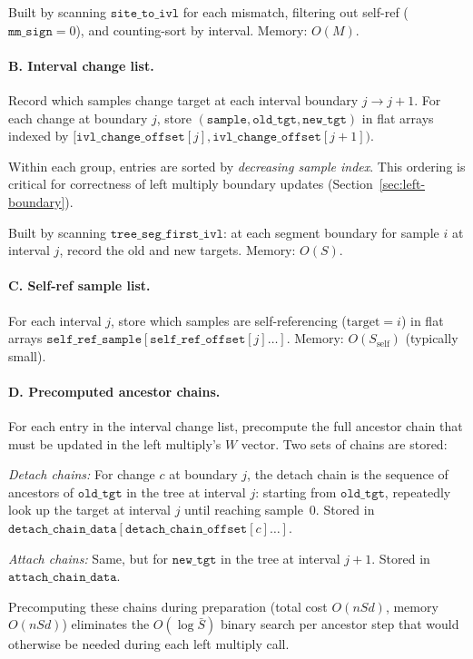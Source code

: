 \documentclass[11pt]{article}
\begin{document}
Built by scanning $\texttt{site\_to\_ivl}$ for each mismatch, filtering
out self-ref ($\texttt{mm\_sign} = 0$), and counting-sort by interval.
Memory: $O(M)$.

\paragraph{B. Interval change list.}
Record which samples change target at each interval boundary $j \to j{+}1$.
For each change at boundary $j$, store
$(\texttt{sample}, \texttt{old\_tgt}, \texttt{new\_tgt})$ in flat arrays
indexed by $[\texttt{ivl\_change\_offset}[j],
\texttt{ivl\_change\_offset}[j{+}1])$.

Within each group, entries are sorted by \emph{decreasing sample index}.
This ordering is critical for correctness of left multiply boundary updates
(Section~\ref{sec:left-boundary}).

Built by scanning $\texttt{tree\_seg\_first\_ivl}$: at each segment
boundary for sample $i$ at interval $j$, record the old and new targets.
Memory: $O(S)$.

\paragraph{C. Self-ref sample list.}
For each interval $j$, store which samples are self-referencing
($\text{target} = i$) in flat arrays
$\texttt{self\_ref\_sample}[\texttt{self\_ref\_offset}[j] \ldots]$.
Memory: $O(S_\text{self})$ (typically small).

\paragraph{D. Precomputed ancestor chains.}
For each entry in the interval change list, precompute the full ancestor
chain that must be updated in the left multiply's $W$ vector.  Two sets of
chains are stored:

\emph{Detach chains:} For change $c$ at boundary $j$, the detach chain is
the sequence of ancestors of $\texttt{old\_tgt}$ in the tree at interval
$j$: starting from $\texttt{old\_tgt}$, repeatedly look up the target at
interval $j$ until reaching sample~0.  Stored in
$\texttt{detach\_chain\_data}[\texttt{detach\_chain\_offset}[c] \ldots]$.

\emph{Attach chains:} Same, but for $\texttt{new\_tgt}$ in the tree at
interval $j{+}1$.  Stored in $\texttt{attach\_chain\_data}$.

Precomputing these chains during preparation (total cost $O(nSd)$, memory
$O(nSd)$) eliminates the $O(\log \bar{S})$ binary search per ancestor step
that would otherwise be needed during each left multiply call.
\end{document}
